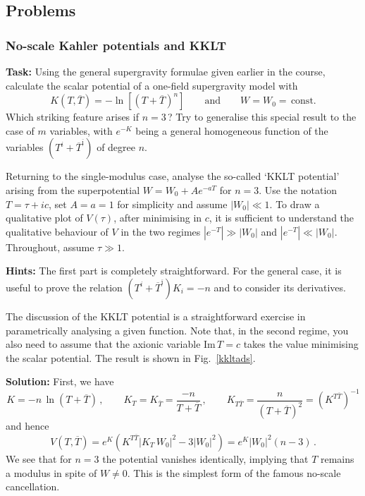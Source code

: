 \documentclass[12pt]{article}
\newcommand{\be}{\begin{equation}}
\newcommand{\ee}{\end{equation}}
\newcommand{\ol}{\overline}
\numberwithin{equation}{section}
\begin{document}
\subsection{Problems}

\subsubsection{No-scale Kahler potentials and KKLT}
\label{nsp}

{\bf Task:}
Using the general supergravity formulae given earlier in the course, calculate the scalar potential of a one-field supergravity model with
\be
K(T,\ol{T})=-\ln\left[(T+\ol{T})^n\right]\qquad \mbox{and}\qquad W=W_0=\,\mbox{const.}
\ee
Which striking feature arises if $n\!=\!3\,$? Try to generalise this special result to the case of $m$ variables, with $e^{-K}$ being a general homogeneous function of the variables $(T^i+\ol{T}^{\ol{\imath}})$ of degree $n$.

Returning to the single-modulus case, analyse the so-called `KKLT potential' arising from the superpotential $W=W_0+Ae^{-aT}$ for $n=3$. Use the notation $T=\tau+ic$, set $A=a=1$ for simplicity and assume $|W_0|\ll 1$. To draw a qualitative plot of $V(\tau)$, after minimising in $c$, it is sufficient to understand the qualitative behaviour of $V$ in the two regimes $|e^{-T}|\gg |W_0|$ and $|e^{-T}|\ll |W_0|$. Throughout, assume $\tau \gg 1$. 

\noindent
{\bf Hints:} The first part is completely straightforward. For the general case, it is useful to prove the relation $(T^i+\ol{T}^{\ol{\imath}})K_i=-n$ and to consider its derivatives. 

The discussion of the KKLT potential is a straightforward exercise in parametrically analysing a given function. Note that, in the second regime, you also need to assume that the axionic variable Im$\,T=c$ takes the value minimising the scalar potential. The result is shown in Fig.~\ref{kkltads}.

\noindent
{\bf Solution:} First, we have
\be
K=-n\,\ln(T+\ol{T})\,,\qquad K_T=K_{\ol{T}}=\frac{-n}{T+\ol{T}}\,, \qquad
K_{T\ol{T}} = \frac{n}{(T+\ol{T})^2}=(K^{T\ol{T}})^{-1}
\ee
and hence
\be
V(T,\ol{T})=e^K(K^{T\ol{T}}|K_T\,W_0|^2-3|W_0|^2)=e^K|W_0|^2(n-3)\,.
\ee
We see that for $n=3$ the potential vanishes identically, implying that $T$ remains a modulus in spite of $W\neq 0$. This is the simplest form of the famous no-scale cancellation.
\end{document}

